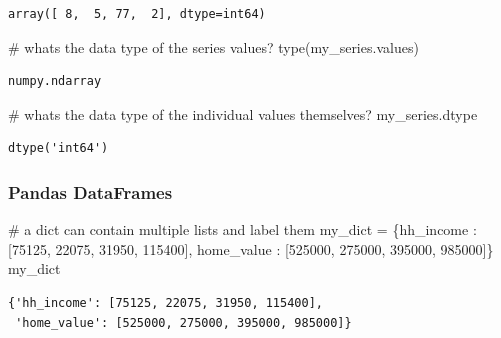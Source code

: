 \documentclass[
  letterpaper,
  DIV=11,
  numbers=noendperiod]{scrreprt}
\newenvironment{Shaded}{\begin{snugshade}}{\end{snugshade}}
\newcommand{\BuiltInTok}[1]{\textcolor[rgb]{0.00,0.23,0.31}{#1}}
\newcommand{\CommentTok}[1]{\textcolor[rgb]{0.37,0.37,0.37}{#1}}
\newcommand{\DecValTok}[1]{\textcolor[rgb]{0.68,0.00,0.00}{#1}}
\newcommand{\NormalTok}[1]{\textcolor[rgb]{0.00,0.23,0.31}{#1}}
\newcommand{\OperatorTok}[1]{\textcolor[rgb]{0.37,0.37,0.37}{#1}}
\newcommand{\StringTok}[1]{\textcolor[rgb]{0.13,0.47,0.30}{#1}}
\begin{document}
\begin{verbatim}
array([ 8,  5, 77,  2], dtype=int64)
\end{verbatim}

\begin{Shaded}
\begin{Highlighting}[]
\CommentTok{\# what\textquotesingle{}s the data type of the series\textquotesingle{} values?}
\BuiltInTok{type}\NormalTok{(my\_series.values)}
\end{Highlighting}
\end{Shaded}

\begin{verbatim}
numpy.ndarray
\end{verbatim}

\begin{Shaded}
\begin{Highlighting}[]
\CommentTok{\# what\textquotesingle{}s the data type of the individual values themselves?}
\NormalTok{my\_series.dtype}
\end{Highlighting}
\end{Shaded}

\begin{verbatim}
dtype('int64')
\end{verbatim}

\subsubsection{Pandas DataFrames}\label{pandas-dataframes}

\begin{Shaded}
\begin{Highlighting}[]
\CommentTok{\# a dict can contain multiple lists and label them}
\NormalTok{my\_dict }\OperatorTok{=}\NormalTok{ \{}\StringTok{\textquotesingle{}hh\_income\textquotesingle{}}\NormalTok{  : [}\DecValTok{75125}\NormalTok{, }\DecValTok{22075}\NormalTok{, }\DecValTok{31950}\NormalTok{, }\DecValTok{115400}\NormalTok{],}
           \StringTok{\textquotesingle{}home\_value\textquotesingle{}}\NormalTok{ : [}\DecValTok{525000}\NormalTok{, }\DecValTok{275000}\NormalTok{, }\DecValTok{395000}\NormalTok{, }\DecValTok{985000}\NormalTok{]\}}
\NormalTok{my\_dict}
\end{Highlighting}
\end{Shaded}

\begin{verbatim}
{'hh_income': [75125, 22075, 31950, 115400],
 'home_value': [525000, 275000, 395000, 985000]}
\end{verbatim}
\end{document}
